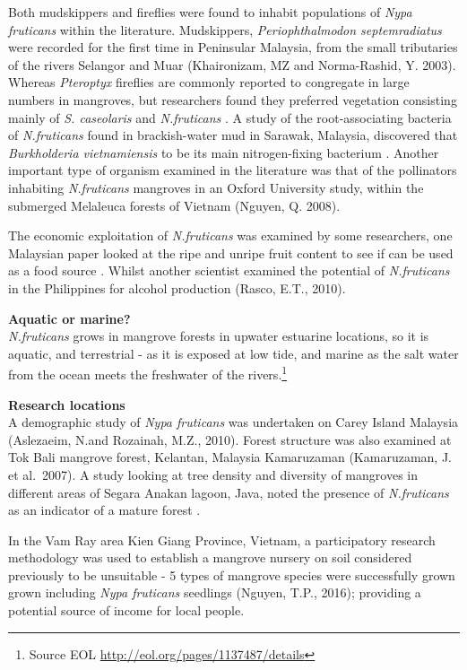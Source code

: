 \documentclass[]{book}
\theoremstyle{definition}
\theoremstyle{definition}
\theoremstyle{definition}
\theoremstyle{remark}
\begin{document}
Both mudskippers and fireflies were found to inhabit populations of
\emph{Nypa fruticans} within the literature. Mudskippers,
\emph{Periophthalmodon septemradiatus} were recorded for the first time
in Peninsular Malaysia, from the small tributaries of the rivers
Selangor and Muar (Khaironizam, MZ and Norma-Rashid, Y. 2003). Whereas
\emph{Pteroptyx} fireflies are commonly reported to congregate in large
numbers in mangroves, but researchers found they preferred vegetation
consisting mainly of \emph{S. caseolaris} and \emph{N.fruticans}
\citep{Jusoh_2010}. A study of the root-associating bacteria of
\emph{N.fruticans} found in brackish-water mud in Sarawak, Malaysia,
discovered that \emph{Burkholderia vietnamiensis} to be its main
nitrogen-fixing bacterium \citep{Tang_2010}. Another important type of
organism examined in the literature was that of the pollinators
inhabiting \emph{N.fruticans} mangroves in an Oxford University study,
within the submerged Melaleuca forests of Vietnam (Nguyen, Q. 2008).

The economic exploitation of \emph{N.fruticans} was examined by some
researchers, one Malaysian paper looked at the ripe and unripe fruit
content to see if can be used as a food source \citep{Chau_Sum_2013}.
Whilst another scientist examined the potential of \emph{N.fruticans} in
the Philippines for alcohol production (Rasco, E.T., 2010).

\textbf{Aquatic or marine?}\\
\emph{N.fruticans} grows in mangrove forests in upwater estuarine
locations, so it is aquatic, and terrestrial - as it is exposed at low
tide, and marine as the salt water from the ocean meets the freshwater
of the rivers.\footnote{Source EOL
  \url{http://eol.org/pages/1137487/details}}

\textbf{Research locations}\\
A demographic study of \emph{Nypa fruticans} was undertaken on Carey
Island Malaysia (Aslezaeim, N.and Rozainah, M.Z., 2010). Forest
structure was also examined at Tok Bali mangrove forest, Kelantan,
Malaysia Kamaruzaman (Kamaruzaman, J. et al.~2007). A study looking at
tree density and diversity of mangroves in different areas of Segara
Anakan lagoon, Java, noted the presence of \emph{N.fruticans} as an
indicator of a mature forest \citep{Hinrichs_2008}.

In the Vam Ray area Kien Giang Province, Vietnam, a participatory
research methodology was used to establish a mangrove nursery on soil
considered previously to be unsuitable - 5 types of mangrove species
were successfully grown grown including \emph{Nypa fruticans} seedlings
(Nguyen, T.P., 2016); providing a potential source of income for local
people.
\end{document}
